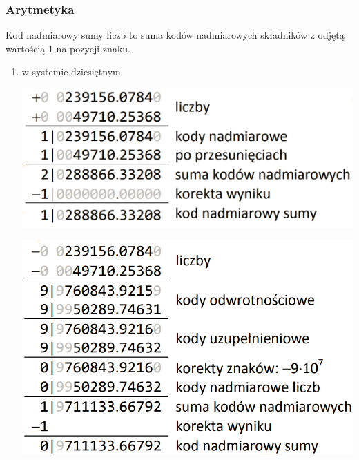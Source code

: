 \documentclass[12pt]{article}
\begin{document}
    \subsubsection{Arytmetyka}
    Kod nadmiarowy sumy liczb to suma kodów nadmiarowych
    składników z odjętą wartością 1 na pozycji znaku.

    \begin{enumerate}
        \item w systemie dziesiętnym
        \begin{center}
            \includegraphics[scale=0.4]{graphics/number-repr/nad-add-dec.png}
        \end{center}
        \begin{center}
            \includegraphics[scale=0.4]{graphics/number-repr/nad-add-dec-2.png}
        \end{center}


\end{enumerate}
\end{document}
